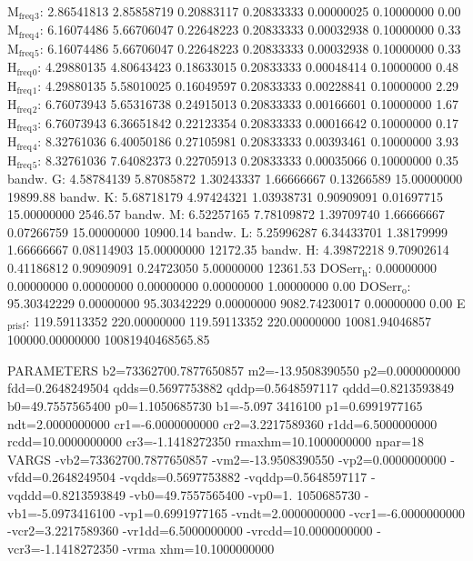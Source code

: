 \documentclass[11pt]{article}
\begin{document}
M\(_{\text{freq}}\)\(_{\text{3}}\):   2.86541813   2.85858719   0.20883117   0.20833333   0.00000025   0.10000000         0.00
M\(_{\text{freq}}\)\(_{\text{4}}\):   6.16074486   5.66706047   0.22648223   0.20833333   0.00032938   0.10000000         0.33
M\(_{\text{freq}}\)\(_{\text{5}}\):   6.16074486   5.66706047   0.22648223   0.20833333   0.00032938   0.10000000         0.33
H\(_{\text{freq}}\)\(_{\text{0}}\):   4.29880135   4.80643423   0.18633015   0.20833333   0.00048414   0.10000000         0.48
H\(_{\text{freq}}\)\(_{\text{1}}\):   4.29880135   5.58010025   0.16049597   0.20833333   0.00228841   0.10000000         2.29
H\(_{\text{freq}}\)\(_{\text{2}}\):   6.76073943   5.65316738   0.24915013   0.20833333   0.00166601   0.10000000         1.67
H\(_{\text{freq}}\)\(_{\text{3}}\):   6.76073943   6.36651842   0.22123354   0.20833333   0.00016642   0.10000000         0.17
H\(_{\text{freq}}\)\(_{\text{4}}\):   8.32761036   6.40050186   0.27105981   0.20833333   0.00393461   0.10000000         3.93
H\(_{\text{freq}}\)\(_{\text{5}}\):   8.32761036   7.64082373   0.22705913   0.20833333   0.00035066   0.10000000         0.35
bandw. G:   4.58784139   5.87085872   1.30243337   1.66666667   0.13266589  15.00000000     19899.88
bandw. K:   5.68718179   4.97424321   1.03938731   0.90909091   0.01697715  15.00000000      2546.57
bandw. M:   6.52257165   7.78109872   1.39709740   1.66666667   0.07266759  15.00000000     10900.14
bandw. L:   5.25996287   6.34433701   1.38179999   1.66666667   0.08114903  15.00000000     12172.35
bandw. H:   4.39872218   9.70902614   0.41186812   0.90909091   0.24723050   5.00000000     12361.53
DOSerr\(_{\text{h}}\):   0.00000000   0.00000000   0.00000000   0.00000000   0.00000000   1.00000000         0.00
DOSerr\(_{\text{o}}\):  95.30342229   0.00000000  95.30342229   0.00000000 9082.74230017   0.00000000         0.00
E\(_{\text{pris}}\)\(_{\text{f}}\): 119.59113352 220.00000000 119.59113352 220.00000000 10081.94046857 100000.00000000 10081940468565.85





PARAMETERS
  b2=73362700.7877650857 m2=-13.9508390550 p2=0.0000000000 fdd=0.2648249504 qdds=0.5697753882 qddp=0.5648597117 qddd=0.8213593849 b0=49.7557565400 p0=1.1050685730 b1=-5.097
3416100 p1=0.6991977165 ndt=2.0000000000 cr1=-6.0000000000 cr2=3.2217589360 r1dd=6.5000000000 rcdd=10.0000000000 cr3=-1.1418272350 rmaxhm=10.1000000000 npar=18 
VARGS
    -vb2=73362700.7877650857 -vm2=-13.9508390550 -vp2=0.0000000000 -vfdd=0.2648249504 -vqdds=0.5697753882 -vqddp=0.5648597117 -vqddd=0.8213593849 -vb0=49.7557565400 -vp0=1.
1050685730 -vb1=-5.0973416100 -vp1=0.6991977165 -vndt=2.0000000000 -vcr1=-6.0000000000 -vcr2=3.2217589360 -vr1dd=6.5000000000 -vrcdd=10.0000000000 -vcr3=-1.1418272350 -vrma
xhm=10.1000000000 
\end{document}
